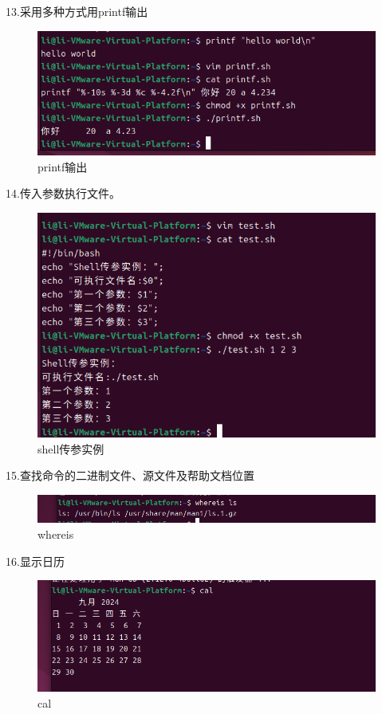 \documentclass[a4paper, 12pt]{article}
\begin{document}
13.采用多种方式用printf输出
\begin{figure}[H]
  \centering
  \includegraphics[width=1\textwidth]{屏幕截图 2024-08-31 204133.png}
  \caption{printf输出}
    \end{figure}

\newpage
14.传入参数执行文件。
\begin{figure}[H]
  \centering
  \includegraphics[width=1\textwidth]{屏幕截图 2024-08-31 194338.png}
  \caption{shell传参实例}
\end{figure}

15.查找命令的二进制文件、源文件及帮助文档位置
 \begin{figure}[H]
  \centering
  \includegraphics[width=1\textwidth]{屏幕截图 2024-09-05 230933.png}
  \caption{whereis}
    \end{figure}
    \newpage
16.显示日历
\begin{figure}[H]
  \centering
  \includegraphics[width=1\textwidth]{屏幕截图 2024-09-05 231209.png}
  \caption{cal}
    \end{figure}
\end{document}
